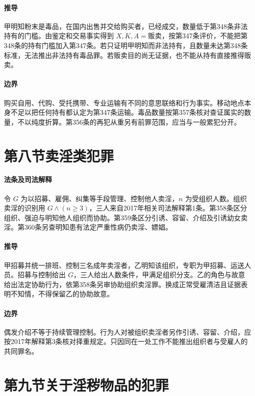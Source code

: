 \paragraph{推导}
甲明知粉末是毒品，在国内出售并交给购买者，已经成交，数量低于第348条非法持有的门槛。由鉴定和交易事实得到 \(X,K,A=\text{贩卖}\)，按第347条评价，不能把第348条的持有门槛加入第347条。若只证明甲明知而非法持有，且数量未达第348条标准，无法推出非法持有毒品罪。若贩卖目的尚无证据，也不能从持有直接推得贩卖。

\paragraph{边界}
购买自用、代购、受托携带、专业运输有不同的意思联络和行为事实。移动地点本身不足以把任何持有都认定为第347条运输。毒品数量按第357条核对查证属实的数量，不以纯度折算。第356条的再犯从重另有前罪范围，应当与一般累犯分开。

\section{第八节\quad 卖淫类犯罪}

\paragraph{法条及司法解释}
令 \(G\) 为以招募、雇佣、纠集等手段管理、控制他人卖淫，\(n\) 为受组织人数。组织卖淫的识别用 \(G\land(n\ge3)\)，三人来自2017年相关司法解释第1条。第358条区分组织、强迫与明知他人组织而协助。第359条区分引诱、容留、介绍及引诱幼女卖淫。第360条另查明知患有法定严重性病仍卖淫、嫖娼。

\paragraph{推导}
甲招募并统一排班、控制三名成年卖淫者，乙明知该组织，专职为甲招募、运送人员。招募与控制给出 \(G\)，三人给出人数条件，甲满足组织分支。乙的角色与故意给出法定协助行为，依第358条另审协助组织卖淫罪。换成正常受雇清洁且证据表明不知情，不得保留乙的协助故意。

\paragraph{边界}
偶发介绍不等于持续管理控制。行为人对被组织卖淫者另作引诱、容留、介绍，应按2017年解释第3条核对择重规定。只因同在一处工作不能推出组织者与受雇人的共同罪名。

\section{第九节\quad 关于淫秽物品的犯罪}

